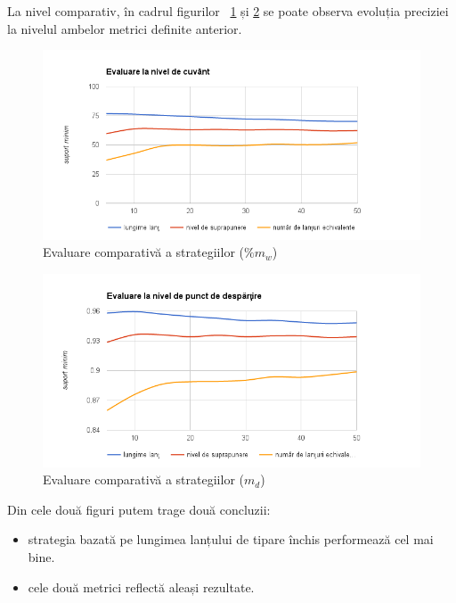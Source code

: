 La nivel comparativ, în cadrul figurilor ~\ref{fig:strategies-word} și \ref{fig:strategies-point} se poate observa evoluția preciziei la nivelul ambelor metrici definite anterior. 


\begin{figure}[h!]
    \centering
    \includegraphics[width=1\textwidth]{figures/strategies-word.png}
    \caption{Evaluare comparativă a strategiilor ($\%m_w$)}
    \label{fig:strategies-word}
\end{figure}


\begin{figure}[h!]
    \centering
    \includegraphics[width=1\textwidth]{figures/strategies-point.png}
    \caption{Evaluare comparativă a strategiilor ($m_d$)}
    \label{fig:strategies-point}
\end{figure}

Din cele două figuri putem trage două concluzii:

\begin{itemize}
\item strategia bazată pe lungimea lanțului de tipare închis performează cel mai bine. 
\item cele două metrici reflectă aleași rezultate. 
\end{itemize}

